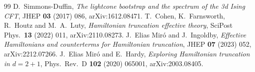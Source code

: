 \begin{thebibliography}{99}
 D.~Simmons-Duffin, \emph{The lightcone bootstrap and the spectrum of the 3d Ising CFT}, JHEP \textbf{03} (2017) 086, arXiv:1612.08471.
 T.~Cohen, K.~Farnsworth, R.~Houtz and M.~A.~Luty, \emph{Hamiltonian truncation effective theory}, SciPost Phys.\ \textbf{13} (2022) 011, arXiv:2110.08273.
 J.~Elias Mir\'o and J.~Ingoldby, \emph{Effective Hamiltonians and counterterms for Hamiltonian truncation}, JHEP \textbf{07} (2023) 052, arXiv:2212.07266.
 J.~Elias Mir\'o and E.~Hardy, \emph{Exploring Hamiltonian truncation in $d=2+1$}, Phys.\ Rev.\ D \textbf{102} (2020) 065001, arXiv:2003.08405.
\end{thebibliography}
